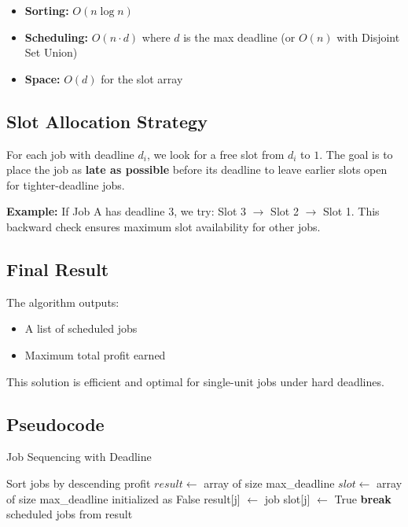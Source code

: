 \documentclass[14pt]{extarticle}
\begin{document}
\begin{itemize}
    \item \textbf{Sorting:} $O(n \log n)$
    \item \textbf{Scheduling:} $O(n \cdot d)$ where $d$ is the max deadline (or $O(n)$ with Disjoint Set Union)
    \item \textbf{Space:} $O(d)$ for the slot array
\end{itemize}

\subsection*{Slot Allocation Strategy}

For each job with deadline $d_i$, we look for a free slot from $d_i$ to $1$. The goal is to place the job as \textbf{late as possible} before its deadline to leave earlier slots open for tighter-deadline jobs.

\textbf{Example:}  
If Job A has deadline 3, we try: Slot 3 $\rightarrow$ Slot 2 $\rightarrow$ Slot 1.  
This backward check ensures maximum slot availability for other jobs.

\subsection*{Final Result}

The algorithm outputs:
\begin{itemize}
    \item A list of scheduled jobs
    \item Maximum total profit earned
\end{itemize}
This solution is efficient and optimal for single-unit jobs under hard deadlines.

\subsection{Pseudocode}
\begin{algorithm}[H]
\caption{Job Sequencing with Deadline}
\begin{algorithmic}[1]
    \State Sort jobs by descending profit
    \State $result \gets$ array of size max\_deadline
    \State $slot \gets$ array of size max\_deadline initialized as False
                \State result[j] $\gets$ job
                \State slot[j] $\gets$ True
                \State \textbf{break}
            \EndIf
        \EndFor
    \EndFor
    \State \Return scheduled jobs from result
\EndProcedure
\end{algorithmic}
\end{algorithm}
\end{document}
